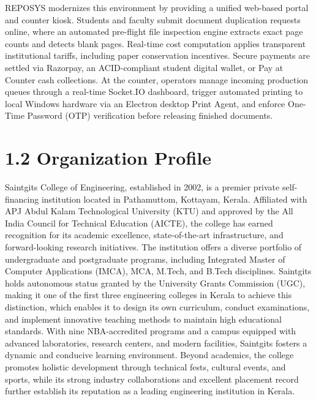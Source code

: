 \documentclass[12pt,a4paper]{report}
\begin{document}
REPOSYS modernizes this environment by providing a unified web-based portal and counter kiosk. Students and faculty submit document duplication requests online, where an automated pre-flight file inspection engine extracts exact page counts and detects blank pages. Real-time cost computation applies transparent institutional tariffs, including paper conservation incentives. Secure payments are settled via Razorpay, an ACID-compliant student digital wallet, or Pay at Counter cash collections. At the counter, operators manage incoming production queues through a real-time Socket.IO dashboard, trigger automated printing to local Windows hardware via an Electron desktop Print Agent, and enforce One-Time Password (OTP) verification before releasing finished documents.

\section{1.2 Organization Profile}
Saintgits College of Engineering, established in 2002, is a premier private self-financing institution located in Pathamuttom, Kottayam, Kerala. Affiliated with APJ Abdul Kalam Technological University (KTU) and approved by the All India Council for Technical Education (AICTE), the college has earned recognition for its academic excellence, state-of-the-art infrastructure, and forward-looking research initiatives. The institution offers a diverse portfolio of undergraduate and postgraduate programs, including Integrated Master of Computer Applications (IMCA), MCA, M.Tech, and B.Tech disciplines. Saintgits holds autonomous status granted by the University Grants Commission (UGC), making it one of the first three engineering colleges in Kerala to achieve this distinction, which enables it to design its own curriculum, conduct examinations, and implement innovative teaching methods to maintain high educational standards. With nine NBA-accredited programs and a campus equipped with advanced laboratories, research centers, and modern facilities, Saintgits fosters a dynamic and conducive learning environment. Beyond academics, the college promotes holistic development through technical fests, cultural events, and sports, while its strong industry collaborations and excellent placement record further establish its reputation as a leading engineering institution in Kerala.
\end{document}
